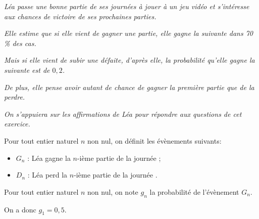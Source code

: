 \medskip

\emph{Léa passe une bonne partie de ses journées à jouer à un jeu vidéo et s'intéresse aux chances de victoire de ses prochaines parties.}

\medskip

\emph{Elle estime que si elle vient de gagner une partie, elle gagne la suivante dans 70\,\% des cas.}

\medskip

\emph{Mais si elle vient de subir une défaite, d'après elle, la probabilité qu'elle gagne la suivante est de $0,2$.}

\emph{De plus, elle pense avoir autant de chance de gagner la première partie que de la perdre.}

\emph{On s'appuiera sur les affirmations de Léa pour répondre aux questions de cet exercice.}

\medskip

Pour tout entier naturel $n$ non nul, on définit les évènements suivants: 

\begin{itemize}[label=$\bullet~$]
\item $G_n$ : \og Léa gagne la $n$-ième partie de la journée \fg{} ;
\item $D_n$ : \og Léa perd la $n$-ième partie de la journée \fg.
\end{itemize}

\smallskip

Pour tout entier naturel $n$ non nul, on note $g_n$ la probabilité de l'évènement $G_n$.

On a donc $g_1 = 0,5$.

\medskip

